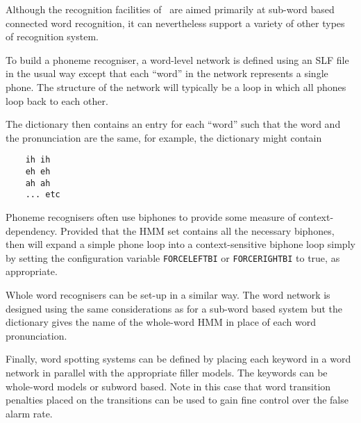 
Although the recognition facilities of \HTK\ are aimed primarily
at sub-word based connected word recognition, it can nevertheless
support a variety of other types of recognition system.

To build a phoneme recogniser, a word-level network is defined using
an SLF file in the usual
way except that each ``word'' in the network represents a single phone.
The structure of the network will typically be a loop in which all
phones loop back to each other.

The dictionary then contains an entry for each ``word'' such that the word and
the pronunciation are the same, for example, the dictionary might contain
\begin{verbatim}
    ih ih
    eh eh
    ah ah
    ... etc
\end{verbatim}

Phoneme recognisers often use biphones to provide some measure of
context-dependency.  Provided that the HMM set contains all the necessary
biphones, then  will expand a simple phone loop into a context-sensitive
biphone loop simply by setting the configuration variable 
\texttt{FORCELEFTBI} or \texttt{FORCERIGHTBI} to true, as appropriate.

Whole word recognisers can be set-up in a similar way.  The word network
is designed using the same considerations as for a sub-word based system
but the dictionary gives the name of the whole-word HMM in place of each
word pronunciation.

Finally, word spotting systems can be defined by placing each keyword
in a word network in parallel with the appropriate filler models.
The keywords can be whole-word models or subword based.  Note in this
case that word transition penalties placed on the transitions can be
used to gain fine control over the false alarm rate.


